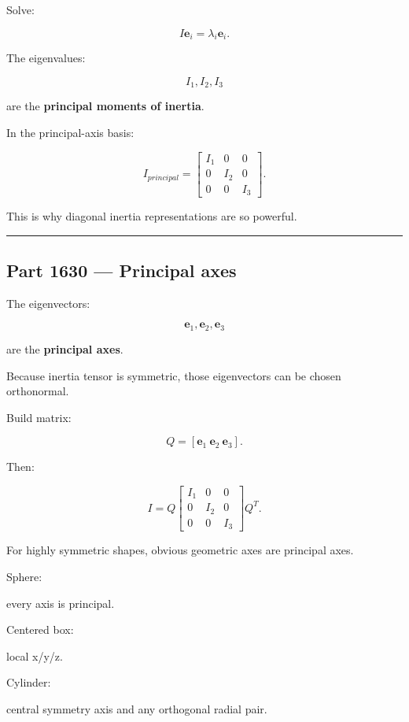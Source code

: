 Solve:

\[
I\mathbf{e}_i
=
\lambda_i\mathbf{e}_i.
\]

The eigenvalues:

\[
\boxed{
I_1,I_2,I_3
}
\]

are the \textbf{principal moments of inertia}.

In the principal-axis basis:

\[
I_{principal}
=
\begin{bmatrix}
I_1&0&0\\
0&I_2&0\\
0&0&I_3
\end{bmatrix}.
\]

This is why diagonal inertia representations are so powerful.

\begin{center}\rule{0.5\linewidth}{0.5pt}\end{center}

\subsection{Part 1630 --- Principal axes}\label{06-engine-ii-ch035-part-1630-principal-axes}

\hypertarget{06-engine-ii-ch035-part-1630-principal-axes}{}

The eigenvectors:

\[
\mathbf{e}_1,\mathbf{e}_2,\mathbf{e}_3
\]

are the \textbf{principal axes}.

Because inertia tensor is symmetric, those eigenvectors can be chosen orthonormal.

Build matrix:

\[
Q=
[
\mathbf{e}_1\
\mathbf{e}_2\
\mathbf{e}_3
].
\]

Then:

\[
\boxed{
I
=
Q
\begin{bmatrix}
I_1&0&0\\
0&I_2&0\\
0&0&I_3
\end{bmatrix}
Q^T.
}
\]

For highly symmetric shapes, obvious geometric axes are principal axes.

Sphere:

every axis is principal.

Centered box:

local x/y/z.

Cylinder:

central symmetry axis and any orthogonal radial pair.

